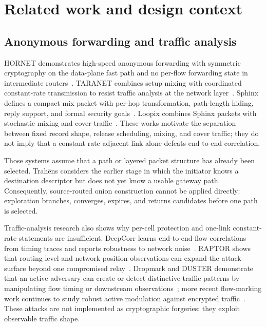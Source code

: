 \documentclass[11pt,oneside]{article}
\newcommand{\ProtoName}{Trah\={e}ns}
\begin{document}
\section{Related work and design context}
\label{sec:background}

\subsection{Anonymous forwarding and traffic analysis}

HORNET demonstrates high-speed anonymous forwarding with symmetric cryptography on the data-plane fast path and no per-flow forwarding state in intermediate routers~\cite{hornet}. TARANET combines setup mixing with coordinated constant-rate transmission to resist traffic analysis at the network layer~\cite{taranet}. Sphinx defines a compact mix packet with per-hop transformation, path-length hiding, reply support, and formal security goals~\cite{sphinx}. Loopix combines Sphinx packets with stochastic mixing and cover traffic~\cite{loopix}. These works motivate the separation between fixed record shape, release scheduling, mixing, and cover traffic; they do not imply that a constant-rate adjacent link alone defeats end-to-end correlation.

Those systems assume that a path or layered packet structure has already been selected. \ProtoName{} considers the earlier stage in which the initiator knows a destination descriptor but does not yet know a usable gateway path. Consequently, source-routed onion construction cannot be applied directly: exploration branches, converges, expires, and returns candidates before one path is selected.


Traffic-analysis research also shows why per-cell protection and one-link constant-rate statements are insufficient. DeepCorr learns end-to-end flow correlations from timing traces and reports robustness to network noise~\cite{deepcorr}. RAPTOR shows that routing-level and network-position observations can expand the attack surface beyond one compromised relay~\cite{raptor}. Dropmark and DUSTER demonstrate that an active adversary can create or detect distinctive traffic patterns by manipulating flow timing or downstream observations~\cite{dropmark,duster}; more recent flow-marking work continues to study robust active modulation against encrypted traffic~\cite{activeflowmark2026}. These attacks are not implemented as cryptographic forgeries: they exploit observable traffic shape.
\end{document}
